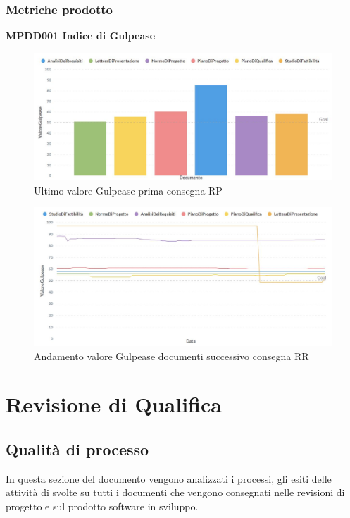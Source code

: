 \documentclass[PianoDiQualifica.tex]{subfiles}
\begin{document}
\subsubsection{Metriche prodotto}
\textbf{MPDD001 Indice di Gulpease}
\begin{figure}[H]
	\centering
	\includegraphics[width=1\linewidth]{RP/gulpease}
	\caption{Ultimo valore Gulpease prima consegna RP}
	\label{fig:processi}
\end{figure}
\begin{figure}[H]
	\centering
	\includegraphics[width=1\linewidth]{RP/gulpeasegrid}
	\caption{Andamento valore Gulpease documenti successivo consegna RR}
	\label{fig:processi}
\end{figure}

\section{Revisione di Qualifica}

\subsection{Qualità di processo}
In questa sezione del documento vengono analizzati i processi, gli esiti delle attività di  svolte su tutti i documenti che vengono consegnati nelle revisioni di progetto e sul prodotto software in sviluppo.
\end{document}

